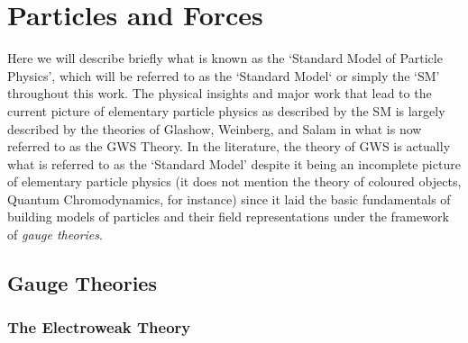 \section{Particles and Forces}

Here we will describe briefly what is known as the `Standard Model of Particle
Physics', which will be referred to as the `Standard Model` or simply the `SM'
throughout
this work. The physical insights and major work that lead to the current picture
of elementary
particle physics as described by the SM is largely described by the theories of
Glashow,
Weinberg, and Salam in what is now referred to as the GWS Theory. In the
literature,
the theory of GWS is actually what is referred to as the `Standard Model'
despite
it being an incomplete picture of elementary particle physics (it does not
mention the theory
of coloured objects, Quantum Chromodynamics, for instance) since it laid the
basic
fundamentals of building models of particles and their field representations
under the
framework of \textit{gauge theories}.


\subsection{Gauge Theories}

\subsubsection{The Electroweak Theory}


